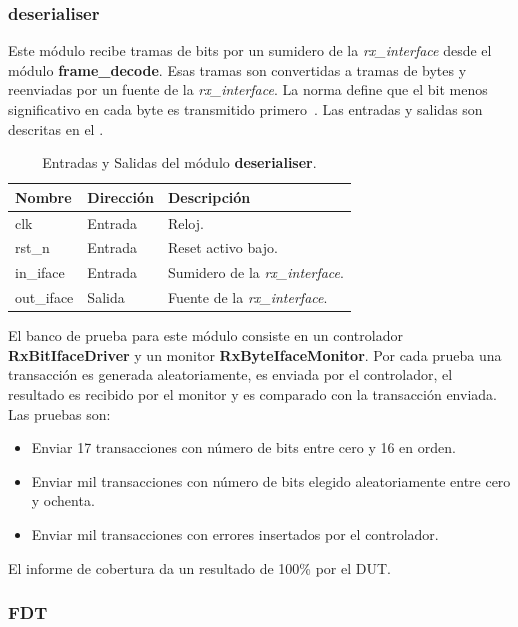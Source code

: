 \documentclass[a4paper, twoside, 11pt]{report}
\begin{document}
\FloatBarrier
\subsubsection{deserialiser}

Este módulo recibe tramas de bits por un sumidero de la \textit{rx\_interface} desde el módulo \textbf{frame\_decode}. Esas tramas son convertidas a tramas de bytes y reenviadas por un fuente de la \textit{rx\_interface}. La norma define que el bit menos significativo en cada byte es transmitido primero~\cite{iso14443-3}. Las entradas y salidas son descritas en el .

\begin{table}[htb]
  \centering
  \tablezebra
  \begin{tabulary}{\linewidth}{l|l|L}
    \textbf{Nombre}&\textbf{Dirección}&\textbf{Descripción} \\
    \hline
    clk&Entrada&Reloj. \\
    rst\_n&Entrada&Reset activo bajo. \\
    in\_iface&Entrada&Sumidero de la \textit{rx\_interface}. \\
    out\_iface&Salida&Fuente de la \textit{rx\_interface}. \\
  \end{tabulary}
  \caption{Entradas y Salidas del módulo \textbf{deserialiser}.}
  \label{tab:ports_deserialiser}
\end{table}

El banco de prueba para este módulo consiste en un controlador \textbf{RxBitIfaceDriver} y un monitor \textbf{RxByteIfaceMonitor}. Por cada prueba una transacción es generada aleatoriamente, es enviada por el controlador, el resultado es recibido por el monitor y es comparado con la transacción enviada. Las pruebas son:

\begin{itemize}
  \item Enviar 17 transacciones con número de bits entre cero y 16 en orden.
  \item Enviar mil transacciones con número de bits elegido aleatoriamente entre cero y ochenta.
  \item Enviar mil transacciones con errores insertados por el controlador.
\end{itemize}

El informe de cobertura da un resultado de 100\% por el DUT.

\FloatBarrier
\subsubsection{FDT}
\label{sec:fdt}
\end{document}
